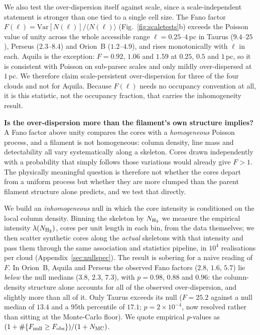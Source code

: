\documentclass[usenatbib,twoside,twocolumn]{mnras}
\begin{document}
We also test the over-dispersion itself against scale, since a scale-independent statement is stronger than one tied to a single cell size. The Fano factor $F(\ell)=\mathrm{Var}[N(\ell)]/\langle N(\ell)\rangle$ (Fig.~\ref{fig:scaletests}b) exceeds the Poisson value of unity across the whole accessible range $\ell=0.25$--$4$\,pc in Taurus ($9.4$--$25$), Perseus ($2.3$--$8.4$) and Orion~B ($1.2$--$4.9$), and rises monotonically with $\ell$ in each. Aquila is the exception: $F=0.92$, $1.06$ and $1.59$ at $0.25$, $0.5$ and $1$\,pc, so it is consistent with Poisson on sub-parsec scales and only mildly over-dispersed at $1$\,pc. We therefore claim scale-persistent over-dispersion for three of the four clouds and not for Aquila. Because $F(\ell)$ needs no occupancy convention at all, it is this statistic, not the occupancy fraction, that carries the inhomogeneity result.

\smallskip\noindent\textbf{Is the over-dispersion more than the filament's own structure implies?} A Fano factor above unity compares the cores with a \emph{homogeneous} Poisson process, and a filament is not homogeneous: column density, line mass and detectability all vary systematically along a skeleton. Cores drawn independently with a probability that simply follows those variations would already give $F>1$. The physically meaningful question is therefore not whether the cores depart from a uniform process but whether they are more clumped than the parent filament structure alone predicts, and we test that directly.

We build an \emph{inhomogeneous} null in which the core intensity is conditioned on the local column density. Binning the skeleton by $N_{\rm H_2}$ we measure the empirical intensity $\lambda(N_{\rm H_2})$, cores per unit length in each bin, from the data themselves; we then scatter synthetic cores along the \emph{actual} skeletons with that intensity and pass them through the same association and statistics pipeline, in $10^4$ realisations per cloud (Appendix~\ref{sec:nullspec}). The result is sobering for a naive reading of $F$. In Orion~B, Aquila and Perseus the observed Fano factors ($2.8$, $1.6$, $5.7$) lie \emph{below} the null medians ($3.8$, $2.3$, $7.3$), with $p=0.98$, $0.88$ and $0.96$: the column-density structure alone accounts for all of the observed over-dispersion, and slightly more than all of it. Only Taurus exceeds its null ($F=25.2$ against a null median of $13.4$ and a $95$th percentile of $17.1$; $p=2\times10^{-4}$, now resolved rather than sitting at the Monte-Carlo floor). We quote empirical $p$-values as $(1+\#\{F_{\rm null}\geq F_{\rm obs}\})/(1+N_{\rm MC})$.
\end{document}
